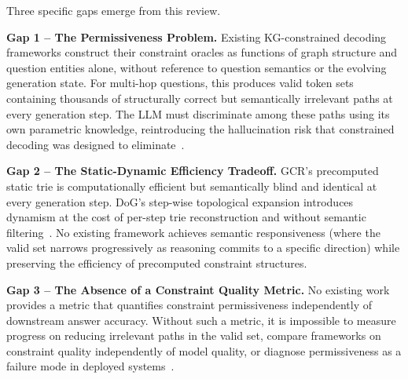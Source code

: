 Three specific gaps emerge from this review.

\textbf{Gap 1 -- The Permissiveness Problem.} Existing KG-constrained decoding frameworks construct their constraint oracles as functions of graph structure and question entities alone, without reference to question semantics or the evolving generation state. For multi-hop questions, this produces valid token sets containing thousands of structurally correct but semantically irrelevant paths at every generation step. The LLM must discriminate among these paths using its own parametric knowledge, reintroducing the hallucination risk that constrained decoding was designed to eliminate~\citep{luo2024gcr, li2024dog}.

\textbf{Gap 2 -- The Static-Dynamic Efficiency Tradeoff.} GCR's precomputed static trie is computationally efficient but semantically blind and identical at every generation step. DoG's step-wise topological expansion introduces dynamism at the cost of per-step trie reconstruction and without semantic filtering~\citep{li2024dog, willard2023outlines}. No existing framework achieves semantic responsiveness (where the valid set narrows progressively as reasoning commits to a specific direction) while preserving the efficiency of precomputed constraint structures.

\textbf{Gap 3 -- The Absence of a Constraint Quality Metric.} No existing work provides a metric that quantifies constraint permissiveness independently of downstream answer accuracy. Without such a metric, it is impossible to measure progress on reducing irrelevant paths in the valid set, compare frameworks on constraint quality independently of model quality, or diagnose permissiveness as a failure mode in deployed systems~\citep{luo2024gcr, li2024dog}.

